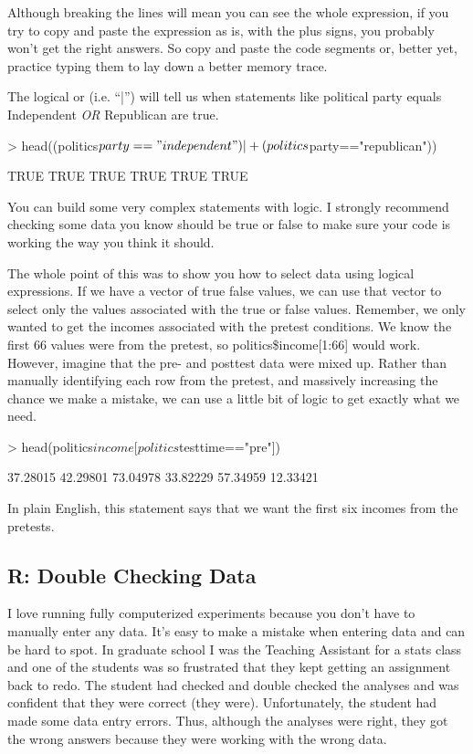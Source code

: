 \documentclass[12pt]{article}
\begin{document}
Although breaking the lines will mean you can see the whole expression, if you
try to copy and paste the expression as is, with the plus signs, you probably
won't get the right answers. So copy and paste the code segments or, better yet,
practice typing them to lay down a better memory trace.

The logical or (i.e. ``|'') will tell us when statements like political party
equals Independent \emph{OR} Republican are true.

\begin{Schunk}
\begin{Sinput}
> head((politics$party=="independent")|
+     (politics$party=="republican"))
\end{Sinput}
\begin{Soutput}
[1] TRUE TRUE TRUE TRUE TRUE TRUE
\end{Soutput}
\end{Schunk}

You can build some very complex statements with logic. I strongly recommend checking
some data you know should be true or false to make sure your code is working the
way you think it should.

The whole point of this was to show you how to select data using logical
expressions. If we have a vector of true false values, we can use that vector
to select only the values associated with the true or false values. Remember,
we only wanted to get the incomes associated with the pretest conditions.
We know the first 66 values were from the pretest, so politics\$income[1:66] would work.
However, imagine that the pre- and posttest
data were mixed up. Rather than manually identifying each row from the pretest,
and massively increasing the chance we make a mistake, we can use a little bit
of logic to get exactly what we need.

\begin{Schunk}
\begin{Sinput}
> head(politics$income[politics$testtime=="pre"])
\end{Sinput}
\begin{Soutput}
[1] 37.28015 42.29801 73.04978 33.82229 57.34959 12.33421
\end{Soutput}
\end{Schunk}

In plain English, this statement says that we want the first six incomes from
the pretests.

\subsection{R: Double Checking Data}
I love running fully computerized experiments because you don't have to manually
enter any data. It's easy to make a mistake when entering data and can be hard
to spot. In graduate school I was the Teaching Assistant for a stats class and
one of the students was so frustrated that they kept getting an assignment back
to redo. The student had checked and double checked the analyses and was
confident that they were correct (they were). Unfortunately, the student had
made some data entry errors. Thus, although the analyses were right, they got
the wrong answers because they were working with the wrong data.
\end{document}
